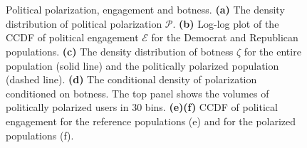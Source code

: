 
\begin{figure}[!tb]
	\centering
	{
	\newcommand\myheight{0.145}
	}
	\\
	{
	\newcommand\myheight{0.16}
	}
	\\
	{ 
	\newcommand\myheight{0.145}
	}
	\caption{ 
		Political polarization, engagement and botness.
		\textbf{(a)} The density distribution of political polarization $\mathcal{P}$. %
		\textbf{(b)} Log-log plot of the CCDF of political engagement $\mathcal{E}$ 
		for the Democrat and Republican populations.
		\textbf{(c)} The density distribution of botness $\zeta$ for the entire population (solid line) and the politically polarized population (dashed line). 
		\textbf{(d)} The conditional density of polarization conditioned on botness.
		The top panel shows the volumes of politically polarized users in 30 bins.
		\textbf{(e)(f)} CCDF of political engagement for the reference populations (e) and for the polarized \Bot populations (f).
	}
	\label{fig:bot-polarization}
\end{figure}